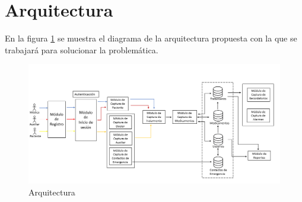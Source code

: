 \section{Arquitectura}

En la figura \ref{fig:arquitectura} se muestra el diagrama de la arquitectura propuesta con la que se trabajará para solucionar la problemática.


\begin{figure}[htb]
	\centering
	\includegraphics[width=1\textwidth]{images/cap2/Arquitectura}
	\caption{Arquitectura} \label{fig:arquitectura}
\end{figure}

